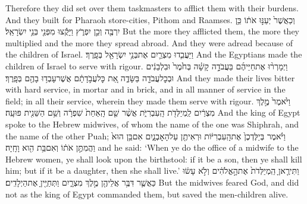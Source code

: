 \documentclass[11pt, openany]{book}
\begin{document}
{Therefore they did set over them taskmasters to afflict them with their burdens. And they built for Pharaoh store-cities, Pithom and Raamses.}
{וְכַאֲשֶׁר֙ יְעַנּ֣וּ אֹת֔וֹ כֵּ֥ן יִרְבֶּ֖ה וְכֵ֣ן יִפְרֹ֑ץ וַיָּקֻ֕צוּ מִפְּנֵ֖י בְּנֵ֥י יִשְׂרָאֵֽל׃}
{But the more they afflicted them, the more they multiplied and the more they spread abroad. And they were adread because of the children of Israel.}
{וַיַּעֲבִ֧דוּ מִצְרַ֛יִם אֶת\maqqaf בְּנֵ֥י יִשְׂרָאֵ֖ל בְּפָֽרֶךְ׃}
{And the Egyptians made the children of Israel to serve with rigour.}
{וַיְמָרְר֨וּ אֶת\maqqaf חַיֵּיהֶ֜ם בַּעֲבֹדָ֣ה קָשָׁ֗ה בְּחֹ֙מֶר֙ וּבִלְבֵנִ֔ים וּבְכׇל\maqqaf עֲבֹדָ֖ה בַּשָּׂדֶ֑ה אֵ֚ת כׇּל\maqqaf עֲבֹ֣דָתָ֔ם אֲשֶׁר\maqqaf עָבְד֥וּ בָהֶ֖ם בְּפָֽרֶךְ׃}
{And they made their lives bitter with hard service, in mortar and in brick, and in all manner of service in the field; in all their service, wherein they made them serve with rigour.}
{וַיֹּ֙אמֶר֙ מֶ֣לֶךְ מִצְרַ֔יִם לַֽמְיַלְּדֹ֖ת הָֽעִבְרִיֹּ֑ת אֲשֶׁ֨ר שֵׁ֤ם הָֽאַחַת֙ שִׁפְרָ֔ה וְשֵׁ֥ם הַשֵּׁנִ֖ית פּוּעָֽה׃}
{And the king of Egypt spoke to the Hebrew midwives, of whom the name of the one was Shiphrah, and the name of the other Puah;}
{וַיֹּ֗אמֶר בְּיַלֶּדְכֶן֙ אֶת\maqqaf הָֽעִבְרִיּ֔וֹת וּרְאִיתֶ֖ן עַל\maqqaf הָאׇבְנָ֑יִם אִם\maqqaf בֵּ֥ן הוּא֙ וַהֲמִתֶּ֣ן אֹת֔וֹ וְאִם\maqqaf בַּ֥ת הִ֖וא וָחָֽיָה׃}
{and he said: ‘When ye do the office of a midwife to the Hebrew women, ye shall look upon the birthstool: if it be a son, then ye shall kill him; but if it be a daughter, then she shall live.’}
{וַתִּירֶ֤אןָ הַֽמְיַלְּדֹת֙ אֶת\maqqaf הָ֣אֱלֹהִ֔ים וְלֹ֣א עָשׂ֔וּ כַּאֲשֶׁ֛ר דִּבֶּ֥ר אֲלֵיהֶ֖ן מֶ֣לֶךְ מִצְרָ֑יִם וַתְּחַיֶּ֖יןָ אֶת\maqqaf הַיְלָדִֽים׃}
{But the midwives feared God, and did not as the king of Egypt commanded them, but saved the men-children alive.}

\clearpage
\fancyhead[C]{\haftarahname}


\vspace{12pt}
\end{document}
